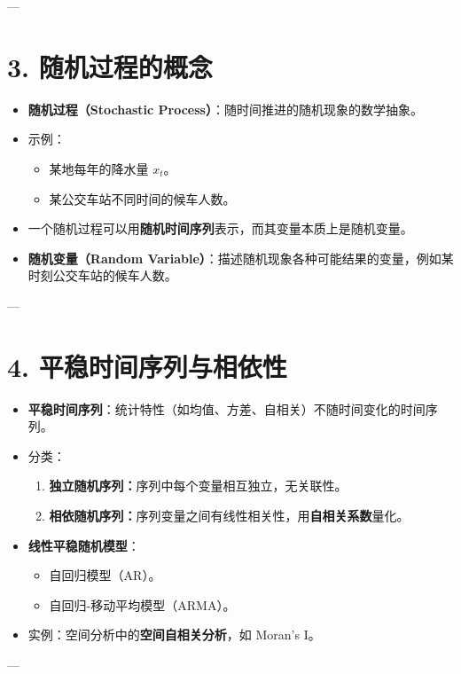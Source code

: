 \documentclass[12pt]{article}
\begin{document}
---

\section*{3. 随机过程的概念}
\begin{itemize}
    \item \textbf{随机过程（Stochastic Process）}：随时间推进的随机现象的数学抽象。
    \item 示例：
    \begin{itemize}
        \item 某地每年的降水量 \( x_t \)。
        \item 某公交车站不同时间的候车人数。
    \end{itemize}
    \item 一个随机过程可以用\textbf{随机时间序列}表示，而其变量本质上是随机变量。
    \item \textbf{随机变量（Random Variable）}：描述随机现象各种可能结果的变量，例如某时刻公交车站的候车人数。
\end{itemize}

---

\section*{4. 平稳时间序列与相依性}
\begin{itemize}
    \item \textbf{平稳时间序列}：统计特性（如均值、方差、自相关）不随时间变化的时间序列。
    \item 分类：
    \begin{enumerate}[label=(\alph*)]
        \item \textbf{独立随机序列：}序列中每个变量相互独立，无关联性。
        \item \textbf{相依随机序列：}序列变量之间有线性相关性，用\textbf{自相关系数}量化。
    \end{enumerate}
    \item \textbf{线性平稳随机模型}：
    \begin{itemize}
        \item 自回归模型（AR）。
        \item 自回归-移动平均模型（ARMA）。
    \end{itemize}
    \item 实例：空间分析中的\textbf{空间自相关分析}，如 Moran’s I。
\end{itemize}

---
\end{document}
